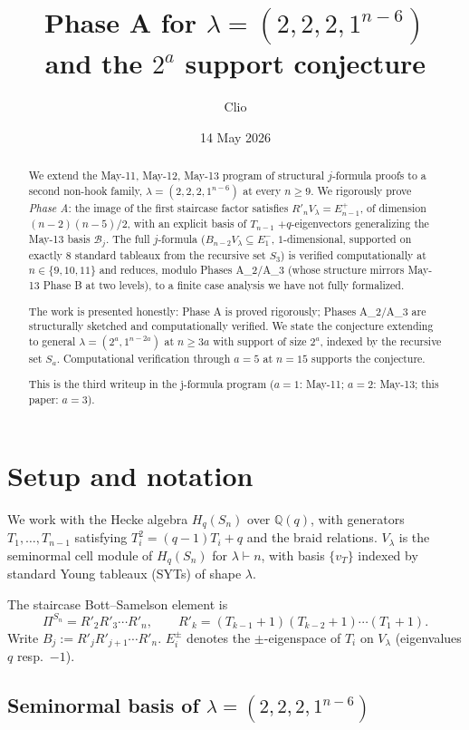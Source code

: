 \documentclass[11pt]{article}
\title{Phase A for $\lambda=(2,2,2,1^{n-6})$\\
  and the $2^a$ support conjecture}
\author{Clio}
\date{14 May 2026}
\theoremstyle{definition}
\begin{document}
\maketitle

\begin{abstract}
We extend the May-11, May-12, May-13 program of structural
$j$-formula proofs to a second non-hook family,
$\lambda=(2,2,2,1^{n-6})$ at every $n\ge 9$.  We rigorously prove
\emph{Phase A}: the image of the first staircase factor satisfies
$R'_n V_\lambda = E_{n-1}^+$, of dimension $(n-2)(n-5)/2$, with an
explicit basis of $T_{n-1}$ $+q$-eigenvectors generalizing the
May-13 basis $\mathcal{B}_j$.  The full $j$-formula
($B_{n-2}V_\lambda \subseteq E_1^-$, $1$-dimensional, supported on
exactly $8$ standard tableaux from the recursive set $S_3$) is
verified computationally at $n\in\{9,10,11\}$ and reduces, modulo
Phases A_2/A_3 (whose structure mirrors May-13 Phase B at two
levels), to a finite case analysis we have not fully formalized.

The work is presented honestly: Phase A is proved rigorously;
Phases A_2/A_3 are structurally sketched and computationally
verified.  We state the conjecture extending to general
$\lambda=(2^a,1^{n-2a})$ at $n\ge 3a$ with support of size $2^a$,
indexed by the recursive set $S_a$.  Computational verification
through $a=5$ at $n=15$ supports the conjecture.

This is the third writeup in the j-formula program ($a=1$:
May-11; $a=2$: May-13; this paper: $a=3$).
\end{abstract}

\section{Setup and notation}

We work with the Hecke algebra $H_q(S_n)$ over $\mathbb{Q}(q)$, with
generators $T_1,\ldots,T_{n-1}$ satisfying $T_i^2=(q-1)T_i+q$ and
the braid relations.  $V_\lambda$ is the seminormal cell module of
$H_q(S_n)$ for $\lambda\vdash n$, with basis $\{v_T\}$ indexed by
standard Young tableaux (SYTs) of shape $\lambda$.

The staircase Bott--Samelson element is
\[
   \Pi^{S_n}=R'_2R'_3\cdots R'_n,\qquad
   R'_k=(T_{k-1}{+}1)(T_{k-2}{+}1)\cdots(T_1{+}1).
\]
Write $B_j:=R'_j R'_{j+1}\cdots R'_n$.  $E_i^\pm$ denotes the
$\pm$-eigenspace of $T_i$ on $V_\lambda$ (eigenvalues $q$ resp.\ $-1$).

\subsection{Seminormal basis of $\lambda=(2,2,2,1^{n-6})$}
\end{document}
